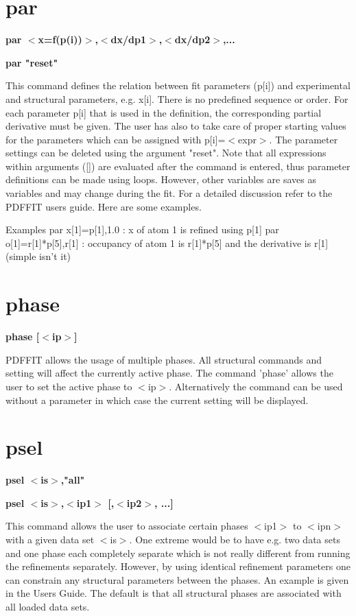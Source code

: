 \section{par}
{\bf par $ <$x=f(p(i))$> $,$ <$dx/dp1$> $,$ <$dx/dp2$> $,... \par }
{\bf par "reset" \par }
\par
\vspace{3pt}
This command defines the relation between fit parameters (p[i]) 
and experimental and structural parameters, e.g. x[i]. There is 
no predefined sequence or order. For each parameter p[i] that is 
used in the definition, the corresponding partial derivative must 
be given. The user has also to take care of proper starting 
values for the parameters which can be assigned with p[i]=$ <$expr$> $. 
The parameter settings can be deleted using the argument "reset". 
Note that all expressions within arguments ([]) are evaluated 
after the command is entered, thus parameter definitions can be 
made using loops. However, other variables are saves as variables 
and may change during the fit. For a detailed discussion refer to 
the PDFFIT users guide. Here are some examples. 
\par
\begin{MacVerbatim}
Examples
par x[1]=p[1],1.0        : x of atom 1 is refined using p[1]
par o[1]=r[1]*p[5],r[1]  : occupancy of atom 1 is r[1]*p[5] and
                           the derivative is r[1] (simple isn't it)
\end{MacVerbatim}
\section{phase}
{\bf phase [$ <$ip$> $] \par }
\par
\vspace{3pt}
PDFFIT allows the usage of multiple phases. All structural 
commands and setting will affect the currently active phase. 
The command 'phase' allows the user to set the active phase 
to $ <$ip$> $. Alternatively the command can be used without a 
parameter in which case the current setting will be displayed. 
\section{psel}
{\bf psel $ <$is$> $,"all" \par }
{\bf psel $ <$is$> $,$ <$ip1$> $ [,$ <$ip2$> $, ...] \par }
\par
\vspace{3pt}
This command allows the user to associate certain phases $ <$ip1$> $ 
to $ <$ipn$> $ with a given data set $ <$is$> $. One extreme would be to have 
e.g. two data sets and one phase each completely separate which is 
not really different from running the refinements separately. 
However, by using identical refinement parameters one can constrain 
any structural parameters between the phases. An example is given 
in the Users Guide. The default is that all structural phases are 
associated with all loaded data sets. 

